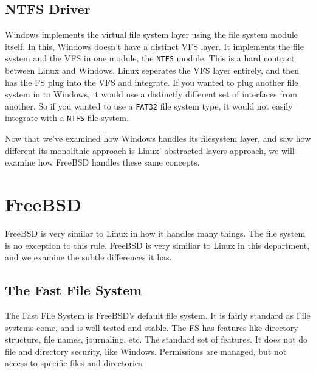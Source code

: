   \subsection{NTFS Driver}
  Windows implements the virtual file system layer using the file system module itself.
  In this, Windows doesn't have a distinct VFS layer. It implements the file system
  and the VFS in one module, the \texttt{NTFS} module. This is a hard contract between
  Linux and Windows. Linux seperates the VFS layer entirely, and then has the FS plug
  into the VFS and integrate. If you wanted to plug another file system in to Windows,
  it would use a distinctly different set of interfaces from another. So if you wanted
  to use a \texttt{FAT32} file system type, it would not easily integrate with a
  \texttt{NTFS} file system. \cite{internals2}

  Now that we've examined how Windows handles its filesystem layer, and saw how
  different its monolithic approach is Linux' abstracted layers approach, we will
  examine how FreeBSD handles these same concepts.

\section{FreeBSD}
  FreeBSD is very similar to Linux in how it handles many things. The file system
  is no exception to this rule. FreeBSD is very similiar to Linux in this department,
  and we examine the subtle differences it has.
 \subsection{The Fast File System}
 The Fast File System is FreeBSD's default file system. It is fairly standard as
 File systems come, and is well tested and stable. The FS has features like directory
 structure, file names, journaling, etc. The standard set of features. It does not
 do file and directory security, like Windows. Permissions are managed, but not access
 to specific files and directories.

